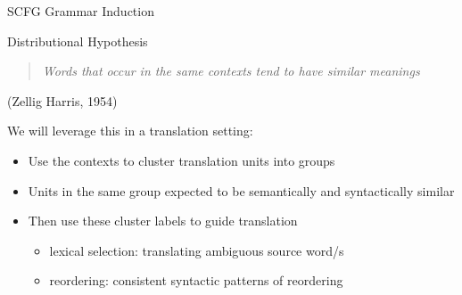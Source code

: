 \documentclass{beamer}
\begin{document}
%
%


\begin{frame}[t]{SCFG Grammar Induction}
\begin{exampleblock}{Distributional Hypothesis}
\begin{quote}
\emph{Words that occur in the same contexts tend to have similar meanings}
\end{quote}
\hfill (Zellig Harris, 1954)
\end{exampleblock}

\vspace{3ex}

We will leverage this in a translation setting:
\begin{itemize}
    \item Use the contexts to \alert{cluster} translation units into groups
    \item Units in the same group expected to be semantically and syntactically similar
    \item Then use these cluster labels to guide translation
    \begin{itemize}
        \item lexical selection: translating ambiguous source word/s
        \item reordering: consistent syntactic patterns of reordering
    \end{itemize}
\end{itemize}
\end{frame}
\end{document}
